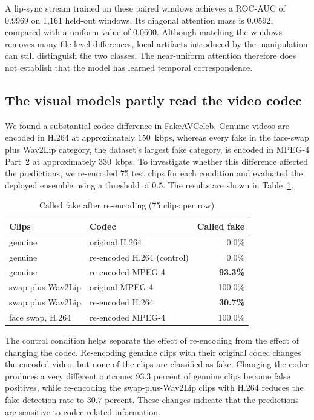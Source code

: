 \documentclass[conference]{IEEEtran}
\begin{document}
A lip-sync stream trained on these paired windows achieves a ROC-AUC of
0.9969 on 1,161 held-out windows. Its diagonal attention mass is 0.0592,
compared with a uniform value of 0.0600. Although matching the windows removes
many file-level differences, local artifacts introduced by the manipulation
can still distinguish the two classes. The near-uniform attention therefore
does not establish that the model has learned temporal correspondence.

\subsection{The visual models partly read the video codec}

We found a substantial codec difference in FakeAVCeleb. Genuine videos are
encoded in H.264 at approximately 150~kbps, whereas every fake in the
face-swap plus Wav2Lip category, the dataset's largest fake category, is
encoded in MPEG-4 Part~2 at approximately 330~kbps. To investigate whether
this difference affected the predictions, we re-encoded 75 test clips for
each condition and evaluated the deployed ensemble using a threshold of 0.5.
The results are shown in Table~\ref{tab:codec}.

\begin{table}[htbp]
\caption{Called fake after re-encoding (75 clips per row)}
\label{tab:codec}
\centering
\begin{tabular}{llr}
\toprule
Clips & Codec & Called fake \\
\midrule
genuine & original H.264 & 0.0\% \\
genuine & re-encoded H.264 (control) & 0.0\% \\
genuine & re-encoded MPEG-4 & \textbf{93.3\%} \\
swap plus Wav2Lip & original MPEG-4 & 100.0\% \\
swap plus Wav2Lip & re-encoded H.264 & \textbf{30.7\%} \\
face swap, H.264 & re-encoded MPEG-4 & 100.0\% \\
\bottomrule
\end{tabular}
\end{table}

The control condition helps separate the effect of re-encoding from the
effect of changing the codec. Re-encoding genuine clips with their original
codec changes the encoded video, but none of the clips are classified as fake.
Changing the codec produces a very different outcome: 93.3 percent of genuine
clips become false positives, while re-encoding the swap-plus-Wav2Lip clips
with H.264 reduces the fake detection rate to 30.7 percent. These changes
indicate that the predictions are sensitive to codec-related information.
\end{document}
